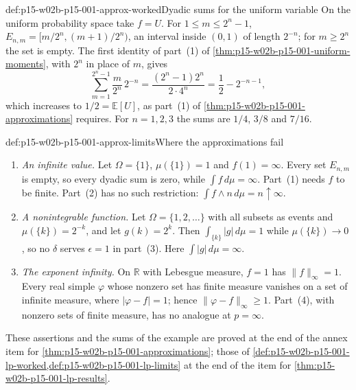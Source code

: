 \begin{hbexample}{def:p15-w02b-p15-001-approx-worked}{Dyadic sums for the uniform variable}
On the uniform probability space take \(f=U\). For \(1\leq m\leq2^n-1\),
\(E_{n,m}=[m/2^n,(m+1)/2^n)\), an interval inside \((0,1)\) of length
\(2^{-n}\); for \(m\geq2^n\) the set is empty. The first identity of
part~(1) of \cref{thm:p15-w02b-p15-001-uniform-moments}, with \(2^n\)
in place of \(m\), gives
\[
 \sum_{m=1}^{2^n-1}\frac m{2^n}\,2^{-n}
 =\frac{(2^n-1)2^n}{2\cdot4^n}=\frac12-2^{-n-1},
\]
which increases to \(1/2=\mathbb E[U]\), as part~(1) of
\cref{thm:p15-w02b-p15-001-approximations} requires. For \(n=1,2,3\)
the sums are \(1/4\), \(3/8\) and \(7/16\).
\end{hbexample}

\begin{hbwarning}{def:p15-w02b-p15-001-approx-limits}{Where the approximations fail}
\par\nobreak
\begin{enumerate}
\item \emph{An infinite value.} Let \(\Omega=\{1\}\),
      \(\mu(\{1\})=1\) and \(f(1)=\infty\). Every set \(E_{n,m}\) is
      empty, so every dyadic sum is zero, while \(\int f\,d\mu=\infty\).
      Part~(1) needs \(f\) to be finite. Part~(2) has no such
      restriction: \(\int f\wedge n\,d\mu=n\uparrow\infty\).
\item \emph{A nonintegrable function.} Let \(\Omega=\{1,2,\ldots\}\)
      with all subsets as events and \(\mu(\{k\})=2^{-k}\), and let
      \(g(k)=2^k\). Then \(\int_{\{k\}}|g|\,d\mu=1\) while
      \(\mu(\{k\})\to0\), so no \(\delta\) serves \(\epsilon=1\) in
      part~(3). Here \(\int|g|\,d\mu=\infty\).
\item \emph{The exponent infinity.} On \(\mathbb R\) with Lebesgue
      measure, \(f=1\) has \(\|f\|_\infty=1\). Every real simple
      \(\varphi\) whose nonzero set has finite measure vanishes on a
      set of infinite measure, where \(|\varphi-f|=1\); hence
      \(\|\varphi-f\|_\infty\geq1\). Part~(4), with nonzero sets of
      finite measure, has no analogue at \(p=\infty\).
\end{enumerate}
These assertions and the sums of the example are proved at the end of
the annex item for \cref{thm:p15-w02b-p15-001-approximations}; those of
\cref{def:p15-w02b-p15-001-lp-worked,def:p15-w02b-p15-001-lp-limits}
at the end of the item for \cref{thm:p15-w02b-p15-001-lp-results}.
\end{hbwarning}

